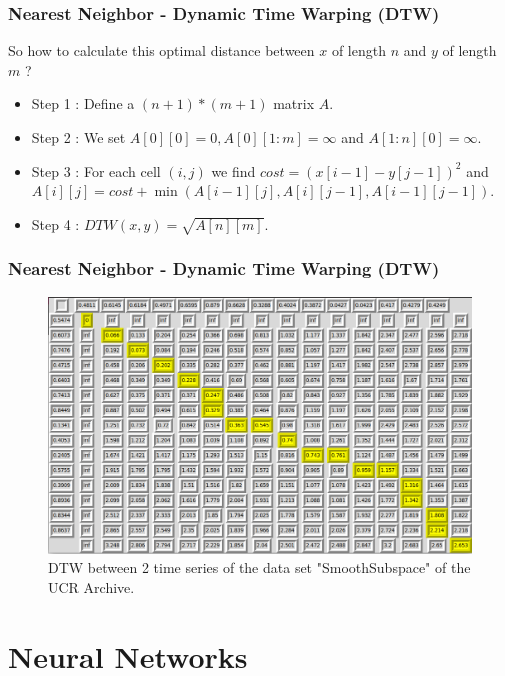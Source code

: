 \documentclass{beamer}
\begin{document}
\begin{frame}
\frametitle{Nearest Neighbor - Dynamic Time Warping (DTW)}
\begin{block}{So how to calculate this optimal distance between $ x $ of length $ n $ and $ y $ of length $ m $ ?}
\begin{itemize}
\item Step 1 : Define a $ (n+1)*(m+1) $ matrix $ A $.
\item Step 2 : We set $ A[0][0]=0,A[0][1:m]=\infty $ and $ A[1:n][0]=\infty $.
\item Step 3 : For each cell $ (i,j) $ we find $ cost = (x[i-1]-y[j-1])^2 $ and $ A[i][j]=cost+\min(A[i-1][j],A[i][j-1],A[i-1][j-1]) $.
\item Step 4 : $ DTW(x,y)=\sqrt{A[n][m]} $.
\end{itemize}
\end{block}
\end{frame}

\begin{frame}
\frametitle{Nearest Neighbor - Dynamic Time Warping (DTW)}
\begin{figure}
\centering
\includegraphics[scale=0.27]{DTW_GUI.png}
\caption{DTW between 2 time series of the data set "SmoothSubspace" of the UCR Archive.}
\end{figure}
\end{frame}

\section{Neural Networks}
\end{document}
